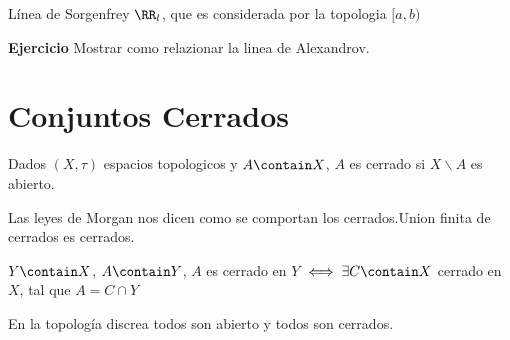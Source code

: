 Línea de Sorgenfrey $\RR_l$, que es considerada por la topologia $ [a,b) $

\textbf{Ejercicio} Mostrar como relazionar la linea de Alexandrov.

\section*{Conjuntos Cerrados}

\begin{define}
	Dados $ (X, \tau) $ espacios topologicos y $ A \contain X$, $A$ es cerrado si $ X \backslash A$ es abierto.
\end{define} 
Las leyes de Morgan nos dicen como se comportan los cerrados.Union finita de cerrados es cerrados.

\begin{thm}
	$Y \contain X$, $A \contain Y$, $A$ es cerrado en $Y$ $\iff \exists C \contain X$ cerrado en $X$, tal que $ A = C \cap Y $
\end{thm}


En la topología discrea todos son abierto y todos son cerrados.          